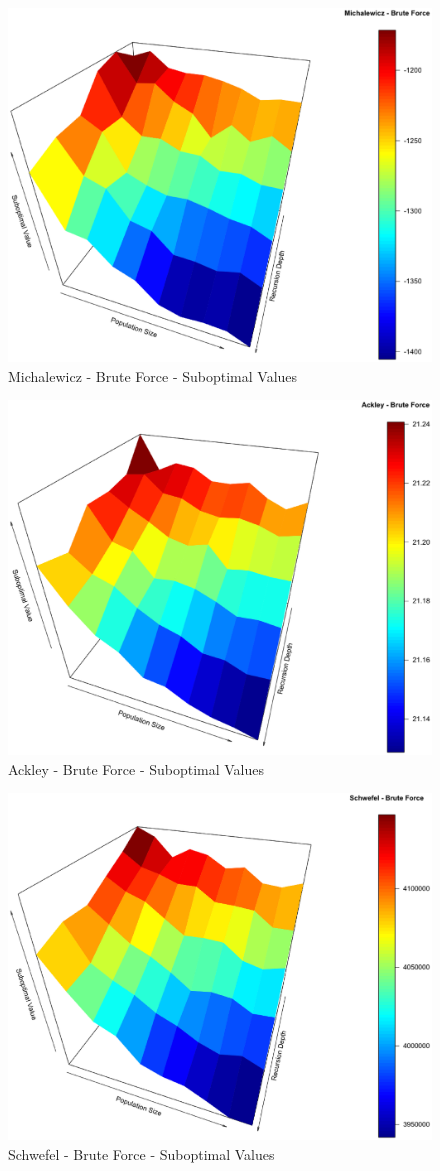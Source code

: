 \documentclass{svproc}
\begin{document}
\begin{figure}[tbp]
\centering
\includegraphics[width=1.0\hsize,height=0.65\hsize]{fig18.eps}
\caption{Michalewicz - Brute Force - Suboptimal Values}
\label{fig06}
\end{figure}

\begin{figure}[tbp]
\centering
\includegraphics[width=1.0\hsize,height=0.65\hsize]{fig21.eps}
\caption{Ackley - Brute Force - Suboptimal Values}
\label{fig07}
\end{figure}

\begin{figure}[tbp]
\centering
\includegraphics[width=1.0\hsize,height=0.65\hsize]{fig24.eps}
\caption{Schwefel - Brute Force - Suboptimal Values}
\label{fig08}
\end{figure}
\end{document}
